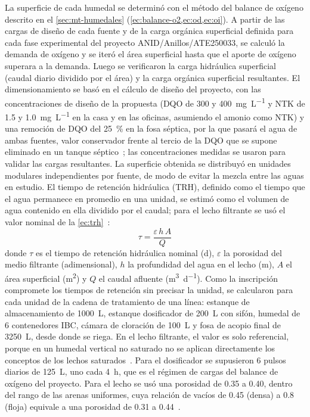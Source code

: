 La superficie de cada humedal se determinó con el método del balance de oxígeno descrito en el \cref{sec:mt-humedales} (\cref{ec:balance-o2,ec:od,ec:oi}).
A partir de las cargas de diseño de cada fuente y de la carga orgánica superficial definida para cada fase experimental del proyecto ANID/Anillos/ATE250033, se calculó la demanda de oxígeno y se iteró el área superficial hasta que el aporte de oxígeno superara a la demanda.
Luego se verificaron la carga hidráulica superficial (caudal diario dividido por el área) y la carga orgánica superficial resultantes.
El dimensionamiento se basó en el cálculo de diseño del proyecto, con las concentraciones de diseño de la propuesta (DQO de 300 y \qty{400}{\milli\gram\per\liter} y NTK de \num{1.5} y \qty{1.0}{\milli\gram\per\liter} en la casa y en las oficinas, asumiendo el amonio como NTK) y una remoción de DQO del \qty{25}{\percent} en la fosa séptica, por la que pasará el agua de ambas fuentes, valor conservador frente al tercio de la DQO que se supone eliminado en un tanque séptico~\parencite{dotro2021humedales}; las concentraciones medidas se usaron para validar las cargas resultantes.
La superficie obtenida se distribuyó en unidades modulares independientes por fuente, de modo de evitar la mezcla entre las aguas en estudio.
El tiempo de retención hidráulica (TRH), definido como el tiempo que el agua permanece en promedio en una unidad, se estimó como el volumen de agua contenido en ella dividido por el caudal; para el lecho filtrante se usó el valor nominal de la \cref{ec:trh}~\parencite{dotro2021humedales}:
\begin{equation}
  \tau = \frac{\varepsilon\, h\, A}{Q}
  \label{ec:trh}
\end{equation}
donde $\tau$ es el tiempo de retención hidráulica nominal (\unit{\day}), $\varepsilon$ la porosidad del medio filtrante (adimensional), $h$ la profundidad del agua en el lecho (\unit{\meter}), $A$ el área superficial (\unit{\square\meter}) y $Q$ el caudal afluente (\unit{\cubic\meter\per\day}).
Como la inscripción compromete los tiempos de retención sin precisar la unidad, se calcularon para cada unidad de la cadena de tratamiento de una línea: estanque de almacenamiento de \qty{1000}{\liter}, estanque dosificador de \qty{200}{\liter} con sifón, humedal de 6 contenedores IBC, cámara de cloración de \qty{100}{\liter} y fosa de acopio final de \qty{3250}{\liter}, desde donde se riega.
En el lecho filtrante, el valor es solo referencial, porque en un humedal vertical no saturado no se aplican directamente los conceptos de los lechos saturados~\parencite{dotro2021humedales}.
Para el dosificador se supusieron 6 pulsos diarios de \qty{125}{\liter}, uno cada \qty{4}{\hour}, que es el régimen de cargas del balance de oxígeno del proyecto.
Para el lecho se usó una porosidad de \num{0.35} a \num{0.40}, dentro del rango de las arenas uniformes, cuya relación de vacíos de \num{0.45} (densa) a \num{0.8} (floja) equivale a una porosidad de \num{0.31} a \num{0.44}~\parencite{das2015fundamentos}.

